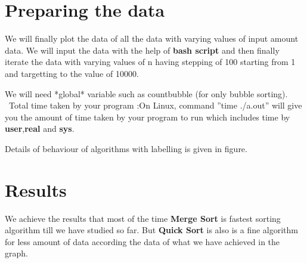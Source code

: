 \documentclass{IEEEtran}
\begin{document}
\section{Preparing the data}
We will finally plot the data of all the data with varying values of input amount data. We will input the data with the help of \textbf{bash script} and then finally iterate the data with varying values of n having stepping of 100 starting from 1 and targetting to the value of 10000.

We will need *global* variable such as countbubble (for only bubble sorting).
\
Total time taken by your program :On Linux, command ”time ./a.out” will give you the amount of time taken by your program to run which includes time by \textbf{user},\textbf{real} and \textbf{sys}.

Details of behaviour of algorithms with labelling is given in figure.

\graphicspath{ {/home/pradyumn/Desktop/ITWS Project/Final Project/LaTeX Report/sortgraph.eps} }

\section{Results}
We achieve the results that most of the time \textbf{Merge Sort} is fastest sorting algorithm till we have studied so far. But \textbf{Quick Sort} is also is a fine algorithm for less amount of data according the data of what we have achieved in the graph.
\end{document}
